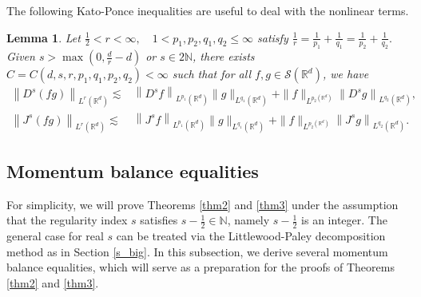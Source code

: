 \documentclass[10pt,twoside,a4paper]{article}
\newtheorem{lem}[thm]{Lemma}
\numberwithin{equation}{section}\allowdisplaybreaks
\def\leq{\leqslant}
\begin{document}
The following Kato-Ponce inequalities are useful to deal with the nonlinear terms. 
\begin{lem} \cite{grafakos2014kato}
	Let $\frac{1}{2}<r<\infty, \quad 1<p_{1}, p_{2}, q_{1}, q_{2} \leq \infty$ satisfy $\frac{1}{r}=\frac{1}{p_{1}}+\frac{1}{q_{1}}=\frac{1}{p_{2}}+\frac{1}{q_{2}} .$
	Given $s>\max \left(0, \frac{d}{r}-d\right)$ or $s \in 2 \mathbb{N}$, there exists $C=C\left(d, s, r, p_{1}, q_{1}, p_{2}, q_{2}\right)<\infty$
	such that for all $f, g \in \mathcal{S}\left(\mathbb{R}^{d}\right)$, we have
	\begin{align}
		\left\|D^{s}(f g)\right\|_{L^{r}\left(\mathbb{R}^{d}\right)} \lesssim &\left\|D^{s} f\right\|_{L^{p_{1}}\left(\mathbb{R}^{d}\right)}\|g\|_{L^{q_{1}}\left(\mathbb{R}^{d}\right)}+\|f\|_{L^{p_{2}\left(\mathbb{R}^{d}\right)}}\left\|D^{s} g\right\|_{L^{q_{2}}\left(\mathbb{R}^{d}\right)}, \label{nonlinear1}\\
			\left\|J^{s}(f g)\right\|_{L^{r}\left(\mathbb{R}^{d}\right)} \lesssim &\left\|J^{s} f\right\|_{L^{p_{1}}\left(\mathbb{R}^{d}\right)}\|g\|_{L^{q_{1}}\left(\mathbb{R}^{d}\right)}+\|f\|_{L^{p_{2}\left(\mathbb{R}^{d}\right)}}\left\|J^{s} g\right\|_{L^{q_{2}}\left(\mathbb{R}^{d}\right)}. \label{nonlinear2}
	\end{align}
\end{lem}


\subsection{Momentum balance equalities}  \label{s2.3}
For simplicity, we will prove Theorems \ref{thm2} and \ref{thm3}  under the assumption that the regularity index \( s \) satisfies   \( s - \frac12 \in \mathbb{N}\), namely $s - \frac12$ is an integer. The general case for  real \( s \) can be treated via the Littlewood-Paley decomposition method as  in Section \ref{s_big}. In this subsection, we derive several momentum balance equalities, which will serve as a preparation for the proofs of Theorems \ref{thm2} and \ref{thm3}.
\end{document}
